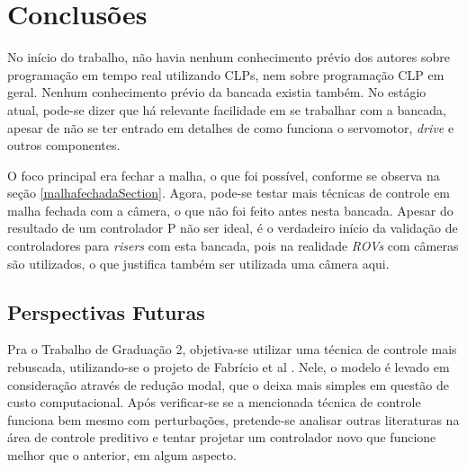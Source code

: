 


\chapter{Conclusões}

\label{CapConclusoes}

No início do trabalho, não havia nenhum conhecimento prévio dos autores sobre programação em tempo real utilizando CLPs, nem sobre programação CLP em geral. Nenhum conhecimento prévio da bancada existia também. No estágio atual, pode-se dizer que há relevante facilidade em se trabalhar com a bancada, apesar de não se ter entrado em detalhes de como funciona o servomotor, \textit{drive} e outros componentes.

O foco principal era fechar a malha, o que foi possível, conforme se observa na seção \ref{malhafechadaSection}. Agora, pode-se testar mais técnicas de controle em malha fechada com a câmera, o que não foi feito antes nesta bancada. Apesar do resultado de um controlador P não ser ideal, é o verdadeiro início da validação de controladores para \textit{risers} com esta bancada, pois na realidade \textit{ROVs} com câmeras são utilizados, o que justifica também ser utilizada uma câmera aqui.


\section{Perspectivas Futuras}

Pra o Trabalho de Graduação 2, objetiva-se utilizar uma técnica de controle mais rebuscada, utilizando-se o projeto de Fabrício et al \cite{fabricioIFAC}. Nele, o modelo é levado em consideração através de redução modal, que o deixa mais simples em questão de custo computacional. Após verificar-se se a mencionada técnica de controle funciona bem mesmo com perturbações, pretende-se analisar outras literaturas na área de controle preditivo e tentar projetar um controlador novo que funcione melhor que o anterior, em algum aspecto.
